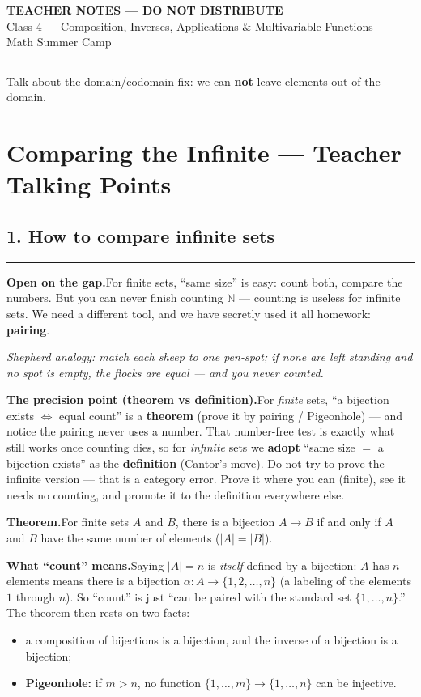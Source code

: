 \documentclass[12pt]{article}
\begin{document}
\pagestyle{fancy}
\begin{center}
{\Large\bfseries TEACHER NOTES --- DO NOT DISTRIBUTE}\\[4pt]
{\large Class 4 --- Composition, Inverses, Applications \& Multivariable Functions}\\[6pt]
Math Summer Camp
\end{center}
\hrule\bigskip


Talk about the domain/codomain fix: we can \textbf{not} leave elements out of the domain.

\section*{Comparing the Infinite --- Teacher Talking Points}

\subsection*{1. How to compare infinite sets}
\hrule
\textbf{Open on the gap.}\quad For finite sets, ``same size'' is easy: count both, compare the numbers. But you can never finish counting $\mathbb{N}$ --- counting is useless for infinite sets. We need a different tool, and we have secretly used it all homework: \textbf{pairing}.

\textit{Shepherd analogy: match each sheep to one pen-spot; if none are left standing and no spot is empty, the flocks are equal --- and you never counted.}

\textbf{The precision point (theorem vs definition).}\quad For \emph{finite} sets, ``a bijection exists $\iff$ equal count'' is a \textbf{theorem} (prove it by pairing / Pigeonhole) --- and notice the pairing never uses a number. That number-free test is exactly what still works once counting dies, so for \emph{infinite} sets we \textbf{adopt} ``same size $=$ a bijection exists'' as the \textbf{definition} (Cantor's move). Do not try to prove the infinite version --- that is a category error. Prove it where you can (finite), see it needs no counting, and promote it to the definition everywhere else.

\textbf{Theorem.}\quad For finite sets $A$ and $B$, there is a bijection $A \to B$ if and only if $A$ and $B$ have the same number of elements ($|A| = |B|$).

\textbf{What ``count'' means.}\quad Saying $|A| = n$ is \emph{itself} defined by a bijection: $A$ has $n$ elements means there is a bijection $\alpha\colon A \to \{1,2,\dots,n\}$ (a labeling of the elements $1$ through $n$). So ``count'' is just ``can be paired with the standard set $\{1,\dots,n\}$.'' The theorem then rests on two facts:
\begin{itemize}
  \item[(i)] a composition of bijections is a bijection, and the inverse of a bijection is a bijection;
  \item[(ii)] \textbf{Pigeonhole:} if $m > n$, no function $\{1,\dots,m\} \to \{1,\dots,n\}$ can be injective.
\end{itemize}
\end{document}
